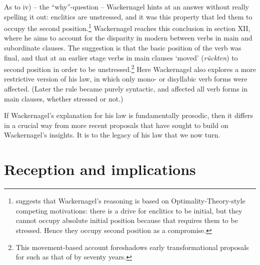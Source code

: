 \documentclass[output=paper]{../langscibook}
\begin{document}
As to iv) -- the ``why''-question -- Wackernagel hints at an answer without really spelling it out: enclitics are unstressed, and it was this property that led them to occupy the second position.\footnote{\citet[294--295]{Hale2017} suggests that Wackernagel's reasoning is based on Optimality-Theory-style competing motivations: there is a drive for enclitics to be initial, but they cannot occupy absolute initial position because that requires them to be stressed. Hence they occupy second position as a compromise.} Wackernagel reaches this conclusion in section XII, where he aims to account for the disparity in modern  between verbs in main and subordinate clauses. The suggestion is that the basic position of the verb was final, and that at an earlier stage verbs in main clauses `moved' (\textit{rückten}) to second position in order to be unstressed.\footnote{This movement-based account foreshadows early transformational proposals for  such as that of \citet{Bach1962} by seventy years.} Here Wackernagel also explores a more restrictive version of his law, in which only mono- or disyllabic verb forms were affected. (Later the rule became purely syntactic, and affected all verb forms in main clauses, whether stressed or not.)

If Wackernagel's explanation for his law is fundamentally prosodic, then it differs in a crucial way from more recent proposals that have sought to build on Wackernagel's insights. It is to the legacy of his law that we now turn.

\section{Reception and implications}\label{reception-implications}
\end{document}
